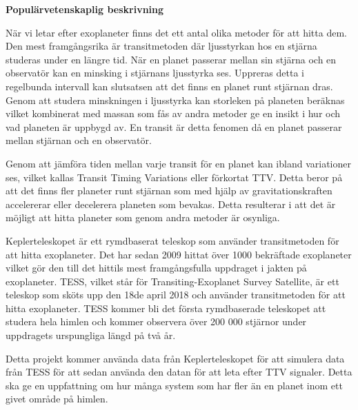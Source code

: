 \documentclass[12pt]{report}
\begin{document}
	
\newpage

\thispagestyle{empty}
\mbox{} %

\newpage

\thispagestyle{empty}

\begin{center}
  {\bf Popul\"arvetenskaplig beskrivning}
\end{center}
	När vi letar efter exoplaneter finns det ett antal olika metoder för att hitta dem. Den mest framgångsrika är transitmetoden där ljusstyrkan hos en stjärna studeras under en längre tid. När en planet passerar mellan sin stjärna och en observatör kan en minsking i stjärnans ljusstyrka ses. Uppreras detta i regelbunda intervall kan slutsatsen att det finns en planet runt stjärnan dras. Genom att studera minskningen i ljusstyrka kan storleken på planeten beräknas vilket kombinerat med massan som fås av andra metoder ge en insikt i hur och vad planeten är uppbygd av. En transit är detta fenomen då en planet passerar mellan stjärnan och en observatör.
	
	Genom att jämföra tiden mellan varje transit för en planet kan ibland variationer ses, vilket kallas Transit Timing Variations eller förkortat TTV. Detta beror på att det finns fler planeter runt stjärnan som med hjälp av gravitationskraften accelererar eller decelerera planeten som bevakas. Detta resulterar i att det är möjligt att hitta planeter som genom andra metoder är osynliga. 
	
	Keplerteleskopet är ett rymdbaserat teleskop som använder transitmetoden för att hitta exoplaneter. Det har sedan 2009 hittat över 1000 bekräftade exoplaneter vilket gör den till det hittils mest framgångsfulla uppdraget i jakten på exoplaneter. TESS, vilket står för Transiting-Exoplanet Survey Satellite, är ett teleskop som sköts upp den 18de april 2018 och använder transitmetoden för att hitta exoplaneter. TESS kommer bli det första rymdbaserade teleskopet att studera hela himlen och kommer observera över 200 000 stjärnor under uppdragets urspungliga längd på två år.
	
	Detta projekt kommer använda data från Keplerteleskopet för att simulera data från TESS för att sedan använda den datan för att leta efter TTV signaler. Detta ska ge en uppfattning om hur många system som har fler än en planet inom ett givet område på himlen.
	
	


\newpage

\thispagestyle{empty}
\mbox{} %
\end{document}
